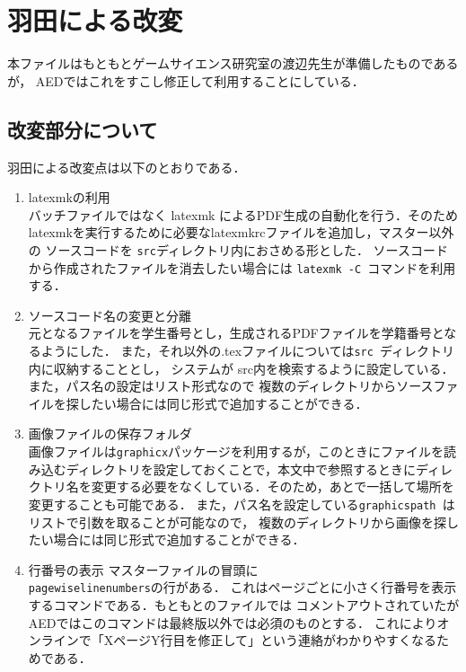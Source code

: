 \section{羽田による改変}
\label{sec:hada}

本ファイルはもともとゲームサイエンス研究室の渡辺先生が準備したものであるが，
AEDではこれをすこし修正して利用することにしている．

\subsection{改変部分について}

羽田による改変点は以下のとおりである．

\begin{enumerate}
  \item latexmkの利用\\
  バッチファイルではなく latexmk によるPDF生成の自動化を行う．そのため
  latexmkを実行するために必要なlatexmkrcファイルを追加し，マスター以外の
  ソースコードを {\tt src}ディレクトリ内におさめる形とした．
  ソースコードから作成されたファイルを消去したい場合には {\tt latexmk -C }コマンドを利用する．

  \item ソースコード名の変更と分離\\
  元となるファイルを学生番号とし，生成されるPDFファイルを学籍番号となるようにした．
  また，それ以外の{.tex}ファイルについては{\tt src }ディレクトリ内に収納することとし，
  システムが src内を検索するように設定している．
  また，パス名の設定はリスト形式なので
  複数のディレクトリからソースファイルを探したい場合には同じ形式で追加することができる．

  \item 画像ファイルの保存フォルダ\\
  画像ファイルは{\tt graphicx}パッケージを利用するが，このときにファイルを読み込むディレクトリを設定しておくことで，本文中で参照するときにディレクトリ名を変更する必要をなくしている．そのため，あとで一括して場所を変更することも可能である．
  また，パス名を設定している{\tt graphicspath }はリストで引数を取ることが可能なので，
  複数のディレクトリから画像を探したい場合には同じ形式で追加することができる．

  \item 行番号の表示
  マスターファイルの冒頭に{\tt \\pagewiselinenumbers}の行がある．
  これはページごとに小さく行番号を表示するコマンドである．もともとのファイルでは
  コメントアウトされていたがAEDではこのコマンドは最終版以外では必須のものとする．
  これによりオンラインで「XページY行目を修正して」という連絡がわかりやすくなるためである．

\end{enumerate}

